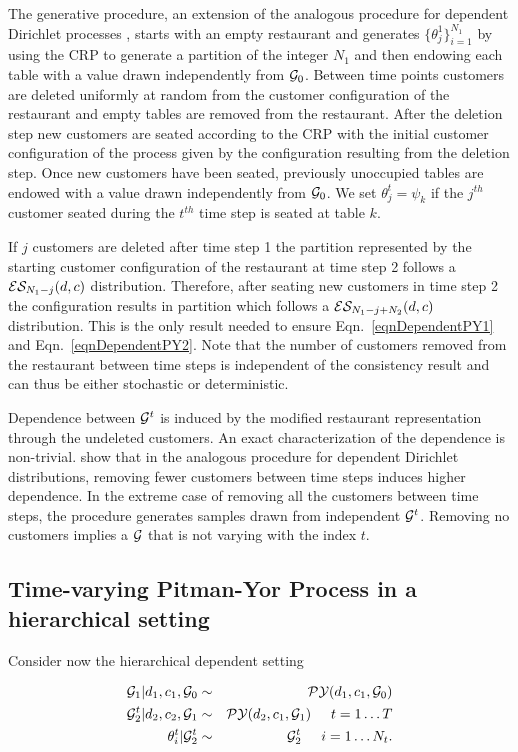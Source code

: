 The generative procedure, an extension of the analogous procedure for dependent Dirichlet processes \cite{caron}, starts with an empty restaurant and generates $\{ \theta_j^1\}_{i = 1}^{N_1}$ by using the CRP to generate a partition of the integer $N_1$ and then endowing each table with a value drawn independently from $\G_0$.  Between time points customers are deleted uniformly at random from the customer configuration of the restaurant and empty tables are removed from the restaurant.  After the deletion step new customers are seated according to the CRP with the initial customer configuration of the process given by the configuration resulting from the deletion step.  Once new customers have been seated, previously unoccupied tables are endowed with a value drawn independently from $\G_0$.  We set $\theta^t_j = \psi_k$ if  the $j^{th}$ customer seated during the $t^{th}$ time step is seated at table $k$.

If $j$ customers are deleted after time step 1 the partition represented by the starting customer configuration of the restaurant at time step 2 follows a $\ES_{N_1- j}(d,c)$ distribution.  Therefore, after seating new customers in time step 2 the configuration results in partition which follows a $\ES_{N_1 - j + N_2}(d,c)$ distribution.  This is the only result needed to ensure Eqn.~\ref{eqnDependentPY1} and Eqn.~\ref{eqnDependentPY2}.  Note that the number of customers removed from the restaurant between time steps is independent of the consistency result and can thus be either stochastic or deterministic.

Dependence between $\G^t$ is induced by the modified restaurant representation through the undeleted customers.  An exact characterization of the dependence is non-trivial.   \cite{caron} show that in the analogous procedure for dependent Dirichlet distributions, removing fewer customers between time steps induces higher dependence.  In the extreme case of removing all the customers between time steps, the procedure generates samples drawn from independent $\G^t$. Removing no customers implies a $\G$ that is not varying with the index $t$. 

\subsection{Time-varying Pitman-Yor Process in a hierarchical setting}

Consider now the hierarchical dependent setting 

\begin{eqnarray*}
\G_1 | d_1, c_1, \G_0 &\sim& \PY(d_1, c_1, \G_0)\\
\G_2^t | d_2, c_2, \G_1&\sim& \PY(d_2, c_1, \G_1) \hspace{.5cm} t = 1\dots T\\
\theta^t_i | \G_2^t &\sim& \G_2^t \hspace{.5cm} i = 1\dots N_t.
\end{eqnarray*}

